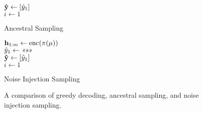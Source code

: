 \begin{figure}[t]
{\begin{minipage}{0.33\textwidth}
\begin{singlespace}
\begin{algorithm}[H]
$\boldsymbol{\hat{\mathbf{y}}} \gets \left[ \hat{{y}}_1\right]$\\
$i \gets 1$\\
\KwResult{$\predutttoks$}
\caption{\small Ancestral Sampling}
\end{algorithm}
\end{singlespace}
\end{minipage}\begin{minipage}{0.38\textwidth}
\small
\begin{singlespace}
\begin{algorithm}[H]
$\mathbf{h}_{1:m} \gets \operatorname{enc}(\pi(\mu))$\\
$\hat{{y}}_1 \gets \textit{<<s>>}$\\
$\boldsymbol{\hat{\mathbf{y}}} \gets \left[ \hat{{y}}_1\right]$\\
$i \gets 1$\\
\KwResult{$\predutttoks$}
\caption{\small Noise Injection Sampling}
\end{algorithm}
\end{singlespace}
\end{minipage}
}
\caption{A comparison of greedy decoding, ancestral sampling, and noise injection sampling.}
\label{fig:noiseinj}


\end{figure}
